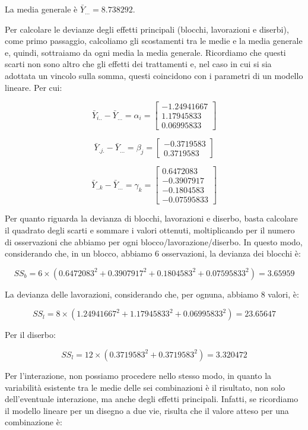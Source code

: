 \documentclass[a4paper,12pt,oneside]{book}
\begin{document}
La media generale è \(\bar{Y}_{...} = 8.738292\).

Per calcolare le devianze degli effetti principali (blocchi, lavorazioni e diserbi), come primo passaggio, calcoliamo gli scostamenti tra le medie e la media generale e, quindi, sottraiamo da ogni media la media generale. Ricordiamo che questi scarti non sono altro che gli effetti dei trattamenti e, nel caso in cui si sia adottata un vincolo sulla somma, questi coincidono con i parametri di un modello lineare. Per cui:

\[\bar{Y}_{i..} - \bar{Y}_{...} = \alpha_i = \left[ {\begin{array}{r}
-1.24941667 \\
1.17945833 \\
0.06995833
\end{array}} \right]\]

\[ \bar{Y}_{.j.} - \bar{Y}_{...} = \beta_j = \left[ {\begin{array}{r}
-0.3719583 \\
0.3719583
\end{array}} \right]\]

\[ \bar{Y}_{..k} - \bar{Y}_{...} = \gamma_k = \left[ {\begin{array}{r}
0.6472083\\
-0.3907917\\
-0.1804583\\
-0.07595833
\end{array}} \right]\]

Per quanto riguarda la devianza di blocchi, lavorazioni e diserbo, basta calcolare il quadrato degli scarti e sommare i valori ottenuti, moltiplicando per il numero di osservazioni che abbiamo per ogni blocco/lavorazione/diserbo. In questo modo, considerando che, in un blocco, abbiamo 6 osservazioni, la devianza dei blocchi è:

\[SS_b = 6 \times \left( 0.6472083^2 + 0.3907917^2 + 0.1804583^2 + 0.07595833 ^ 2 \right) = 3.65959\]

La devianza delle lavorazioni, considerando che, per ognuna, abbiamo 8 valori, è:

\[ SS_l = 8 \times \left(1.24941667^2 + 1.17945833^2  + 0.06995833^2 \right) = 23.65647  \]

Per il diserbo:

\[ SS_l = 12 \times \left(0.3719583^2 + 0.3719583 ^ 2 \right) = 3.320472  \]

Per l'interazione, non possiamo procedere nello stesso modo, in quanto la variabilità esistente tra le medie delle sei combinazioni è il risultato, non solo dell'eventuale interazione, ma anche degli effetti principali. Infatti, se ricordiamo il modello lineare per un disegno a due vie, risulta che il valore atteso per una combinazione è:
\end{document}
